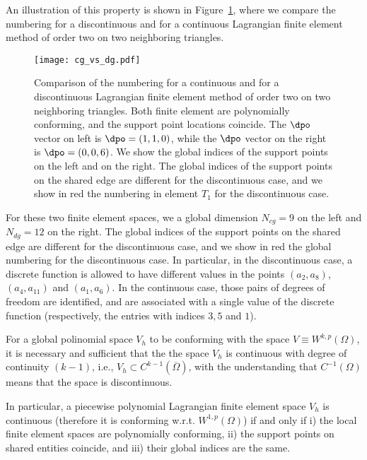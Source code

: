 An illustration of this property is shown in Figure~\ref{fig:cg_vs_dg}, where we compare the numbering for a discontinuous and for a continuous Lagrangian finite element method of order two on two neighboring triangles.

\begin{figure}[!htb]
\centering
\texttt{[image: cg\_vs\_dg.pdf]}
\caption{Comparison of the numbering for a continuous and for a discontinuous Lagrangian finite element method of order two on two neighboring triangles. Both finite element are polynomially conforming, and the support point locations coincide. The $\dpo$ vector on left is $\dpo = (1, 1, 0)$, while the $\dpo$ vector on the right is $\dpo = (0, 0, 6)$. We show the global indices of the support points on the left and on the right. The global indices of the support points on the shared edge are different for the discontinuous case, and we show in red the numbering in element $T_1$ for the discontinuous case.}
\label{fig:cg_vs_dg}
\end{figure}

For these two finite element spaces, we a global dimension $N_{cg} = 9$ on the left and $N_{dg} = 12$ on the right. The global indices of the support points on the shared edge are different for the discontinuous case, and we show in red the global numbering for the discontinuous case. In particular, in the discontinuous case, a discrete function is allowed to have different values in the points $(a_2, a_8)$, $(a_4, a_{11})$ and $(a_1, a_6)$. In the continuous case, those pairs of degrees of freedom are identified, and are associated with a single value of the discrete function (respectively, the entries with indices $3,5$ and $1$).

\begin{theorem}
  For a global polinomial space $V_h$ to be conforming with the space $V \equiv W^{k,p}(\Omega)$, it is necessary and sufficient that the the space $V_h$ is continuous with degree of continuity $(k-1)$, i.e., $V_h \subset C^{k-1}(\overline{\Omega})$, with the understanding that $C^{-1}(\Omega)$ means that the space is discontinuous.
  
  In particular, a piecewise polynomial Lagrangian finite element space $V_h$ is continuous (therefore it is conforming w.r.t. $W^{1,p}(\Omega)$) if and only if i) the local finite element spaces are polynomially conforming, ii) the support points on shared entities coincide, and iii) their global indices are the same.
\end{theorem}